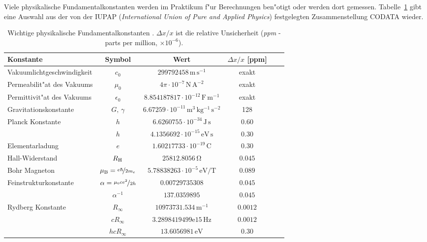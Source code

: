 Viele physikalische Fundamentalkonstanten werden im Praktikum f"ur
Berechnungen ben"otigt oder werden dort gemessen.
Tabelle~\ref{t:fundamentconst} gibt eine Auswahl aus der von der
\textsc{IUPAP} (\textit{International Union of Pure and Applied
Physics}) festgelegten Zusammenstellung \textsc{CODATA} \cite{codata}
wieder.
%
\begin{table}[hb]
  \centering
  \caption[Fundamentalkonstanten]{\label{t:fundamentconst} Wichtige
  physikalische Fundamentalkonstanten \cite{codata}. $\Delta x/x$
  ist die relative Unsicherheit (\textit{ppm} - parts per million, $\times 10^{-6}$).}%
  \begin{tabular}{p{5cm}ccccc}\hline
%
 Konstante & Symbol & Wert & $\Delta x/x$ [ppm]  \\ \hline
%
 Vakuumlichtgeschwindigkeit & $c_0$ & $\mathrm{299792458\,m \, s^{-1}}$ & exakt \\
%
 Permeabilit"at des Vakuums  & $\mu_0$ & $4\pi \cdot 10^{-7}\mathrm{\,N \, A^{-2}}$ & exakt \\
%
 Permittivit"at des Vakuums  & $\epsilon_0 $ & $\mathrm{8.854187817\cdot 10^{-12}\,F \, m^{-1}}$ & exakt \\
%
 Gravitationskonstante  & $G, \, \gamma$ & $\mathrm{6.67259\cdot 10^{-11}\,m^3 \, kg^{-1} \, s^{-2}}$ & 128 \\
%
 Planck Konstante  & $h$ & $\mathrm{6.6260755\cdot 10^{-34}\,J\, s}$ & $\mathrm{0.60}$ \\
                   & $h$ & $\mathrm{4.1356692\cdot 10^{-15}\,eV \, s}$ & $\mathrm{0.30}$ \\
%
 Elementarladung   & $e$ &$\mathrm{1.60217733\cdot 10^{-19}\,C}$ & $\mathrm{0.30}$ \\
%
 Hall-Widerstand & $R_{\rm H}$ & $\mathrm{25812.8056\,\Omega}$ & $\mathrm{0.045}$ \\
%
 Bohr Magneton & $\mu_{\rm B}=\nicefrac{e\hslash}{2m_e}$ & $\mathrm{5.78838263\cdot 10^{-5}\,eV/T}$ & $\mathrm{0.089}$ \\
%
 Feinstrukturkonstante & $\alpha=\nicefrac{\mu_0 ce^2}{2h}$ & $\mathrm{0.00729735308}$ & $\mathrm{0.045}$ \\
%
      & $\alpha^{-1}$ & $\mathrm{137.0359895}$ & $\mathrm{0.045}$ \\
%
%
 Rydberg Konstante & $R_\infty$ & $\mathrm{10973731.534\,m^{-1}}$ & $\mathrm{0.0012}$ \\
%
                   & $cR_\infty$ & $\mathrm{3.2898419499e15\,Hz}$ & $\mathrm{0.0012}$ \\
%
                   & $h c R_\infty$ & $\mathrm{13.6056981\,eV}$ & $\mathrm{0.30}$ \\

\end{tabular}
\end{table}
